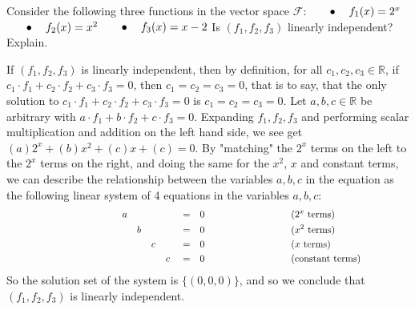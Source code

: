 \documentclass[12pt]{article}
\newenvironment{problem}[2][Problem]
{
	\begin{trivlist} 
		\item[\hskip \labelsep {\bfseries #1 #2:}]
	}
{
	\end{trivlist}
	}
\newenvironment{solution}[1][Solution]
{
	\begin{trivlist} 
		\item[\hskip \labelsep {\itshape #1:}]
	}
	{
	\end{trivlist}
}
\begin{document}
\newpage
\begin{problem}{4}
Consider the following three functions in the vector space $\mathcal{F}$:
\newline
\newline
$\hphantom{100} \bullet \hphantom{10} f_1(x)=2^x$
\newline
\newline
$\hphantom{100} \bullet \hphantom{10} f_2(x)=x^2$
\newline
\newline
$\hphantom{100} \bullet \hphantom{10} f_3(x)=x-2$
\newline
\newline
\noindent
Is $(f_1,f_2,f_3)$ linearly independent? Explain.
\noindent
\newline
\newline
\begin{solution}
If $(f_1,f_2,f_3)$ is linearly independent, then by definition, for all $c_1,c_2,c_3 \in \mathbb{R}$, if $c_1\cdot f_1 + c_2 \cdot f_2 + c_3 \cdot f_3=0$, then $c_1=c_2=c_3=0$, that is to say, that the only solution to $c_1\cdot f_1 + c_2 \cdot f_2 + c_3 \cdot f_3=0$ is $c_1=c_2=c_3=0$. Let $a,b,c \in \mathbb{R}$ be arbitrary with $a\cdot f_1 + b \cdot f_2 + c \cdot f_3=0$. Expanding $f_1,f_2,f_3$ and performing scalar multiplication and addition on the left hand side, we see get $(a)2^x +(b)x^2+(c)x+(c) =0$. By "matching" the $2^x$ terms on the left to the $2^x$ terms on the right, and doing the same for the $x^2$, $x$ and constant terms, we can describe the relationship between the variables $a,b,c$ in the equation as the following linear system of 4 equations in the variables $a,b,c$:
\begin{align*}
&&&&&&&& &&&&&&&& &&&&&&&& &a& &\hphantom{1}& &\hphantom{1}& &\hphantom{1}& &=& &0& &&&&&&&& &&&&&&&& &\text{($2^x$ terms)}& &&&&&&&&\\
&&&&&&&& &&&&&&&& &&&&&&&& &\hphantom{1}& &b& &\hphantom{1}& &\hphantom{1}& &=& &0& &&&&&&&& &&&&&&&& &\text{($x^2$ terms)}& &&&&&&&&\\
&&&&&&&& &&&&&&&& &&&&&&&& &\hphantom{1}& &\hphantom{1}& &c& &\hphantom{1}& &=& &0& &&&&&&&& &&&&&&&&  &\text{($x$ terms)}& &&&&&&&&\\
&&&&&&&& &&&&&&&& &&&&&&&& &\hphantom{1}& &\hphantom{1}& &\hphantom{1}& &c& &=& &0& &&&&&&&& &&&&&&&& &\text{(constant terms)}& &&&&&&&&
\end{align*}
So the solution set of the system is $\{(0,0,0)\}$, and so we conclude that $(f_1,f_2,f_3)$ is linearly independent.
\end{solution}
\end{problem}
\end{document}
